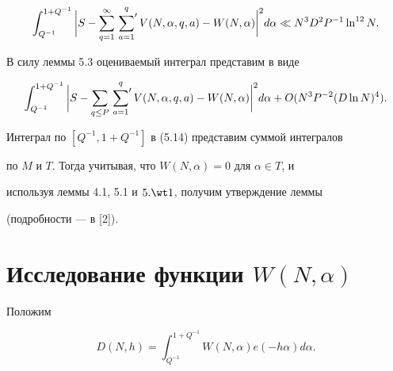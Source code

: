 $$


\int_{Q^{-1}}^{1+Q^{-1}}


\bigg|S - \sum_{q=1}^{\infty}\sideset{}{'}\sum_{a=1}^q 


V(N,\alpha, q, a)-W(N,\alpha)\bigg|^2 d\alpha \ll


N^3D^2P^{-1}\ln^{12} N.


$$





\begin{pf}


В силу леммы 5.3 оцениваемый интеграл представим в виде


\begin{equation}


\int_{Q^{-1}}^{1+Q^{-1}}


\bigg|S - \sum_{q\le P}\sideset{}{'}\sum_{a=1}^q 


V(N,\alpha, q, a)-W(N,\alpha)\bigg|^2 d\alpha +


O(N^3P^{-2}(D\ln N)^4).


\end{equation}





Интеграл по $[Q^{-1}, 1+Q^{-1}]$ в (5.14) представим суммой интегралов


по $M$ и $T$. Тогда учитывая, что $W(N,\alpha)=0$ для $\alpha\in T$, и


используя леммы 4.1, 5.1 и $5.\wt 1$, получим утверждение леммы


(подробности --- в [2]). 


\end{pf}





\section{Исследование функции $W(N,\alpha)$} 





Положим


\begin{equation}


D(N, h)=\int_{Q^{-1}}^{1+Q^{-1}}W(N,\alpha)e(-h\alpha)d\alpha.


\end{equation} 





